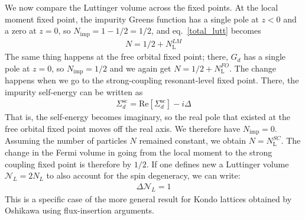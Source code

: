 \documentclass{report}
\numberwithin{equation}{section}
\begin{document}
We now compare the Luttinger volume across the fixed points. At the local moment fixed point, the impurity Greens function has a single pole at \(z<0\) and a zero at \(z=0\), so \(N_\text{imp} = 1 - 1/2 = 1/2\), and eq.~\ref{total_lutt} becomes
\begin{equation}\begin{aligned}
	N = 1/2 + N_\text{L}^{LM}
\end{aligned}\end{equation}
The same thing happens at the free orbital fixed point; there, \(G_d\) has a single pole at \(z=0\), so \(N_\text{imp} = 1/2\) and we again get \(N = 1/2 + N_\text{L}^{FO}\). The change happens when we go to the strong-coupling resonant-level fixed point. There, the impurity self-energy can be written as~\cite{anderson_1961,hewson1993,coleman2015}
\begin{equation}\begin{aligned}
	\Sigma_d^\text{sc} = \text{Re}\left[\Sigma_d^\text{sc}\right] - i\Delta
\end{aligned}\end{equation}
That is, the self-energy becomes imaginary, so the real pole that existed at the free orbital fixed point moves off the real axis. We therefore have \(N_\text{imp} = 0\). Assuming the number of particles \(N\) remained constant, we obtain \(N = N_\text{L}^{SC}\). The change in the Fermi volume in going from the local moment to the strong coupling fixed point is therefore by \(1/2\). If one defines new a Luttinger volume \(\mathcal{N}_L = 2N_L\) to also account for the spin degeneracy, we can write:
\begin{equation}\begin{aligned}
	\label{luttinger_change}
	\Delta \mathcal{N}_L = 1
\end{aligned}\end{equation}
This is a specific case of the more general result for Kondo lattices obtained by Oshikawa using flux-insertion arguments\cite{oshikawa2000topological}.
\end{document}
